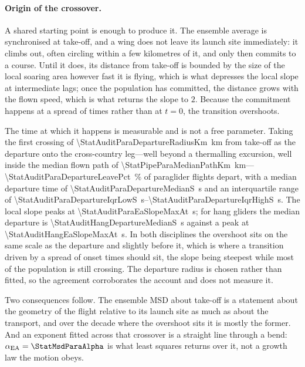 \begin{revblock}
\paragraph{Origin of the crossover.}
A shared starting point is enough to produce it. The ensemble average is synchronised at
take-off, and
a wing does not leave its launch site immediately: it climbs out, often circling within a
few kilometres of it, and only then commits to a course. Until it does, its distance from
take-off is bounded by the size of the local soaring area however fast it is flying, which
is what depresses the local slope at intermediate lags; once the population has committed,
the distance grows with the flown speed, which is what returns the slope to $2$. Because
the commitment happens at a spread of times rather than at $t=0$, the transition
overshoots.

The time at which it happens is measurable and is not a free parameter. Taking the first
crossing of \SI{\StatAuditParaDepartureRadiusKm}{\kilo\metre} from take-off as the
departure onto the cross-country leg---well beyond a thermalling excursion, well inside
the median flown path of \SI{\StatPipeParaMedianPathKm}{\kilo\metre}---%
\SI{\StatAuditParaDepartureLeavePct}{\percent} of paraglider flights depart, with a median
departure time of \SI{\StatAuditParaDepartureMedianS}{\second} and an interquartile range
of \SIrange{\StatAuditParaDepartureIqrLowS}{\StatAuditParaDepartureIqrHighS}{\second}. The
local slope peaks at \SI{\StatAuditParaEaSlopeMaxAt}{\second}; for hang gliders the
median departure is \SI{\StatAuditHangDepartureMedianS}{\second} against a peak at
\SI{\StatAuditHangEaSlopeMaxAt}{\second}. In both disciplines the overshoot sits on the
same scale as the departure and slightly before it, which is where a transition driven by
a spread of onset times should sit, the slope being steepest while most of the population
is still crossing. The departure radius is chosen rather than fitted, so the agreement
corroborates the account and does not measure it.

Two consequences follow. The ensemble MSD about take-off is a statement about the geometry of the flight
relative to its launch site as much as about the transport, and over the decade where the
overshoot sits it is mostly the former. And an exponent fitted across that crossover is a
straight line through a bend: $\alpha_{\mathrm{EA}}=\StatMsdParaAlpha$ is what least
squares returns over it, not a growth law the motion obeys.


\end{revblock}
